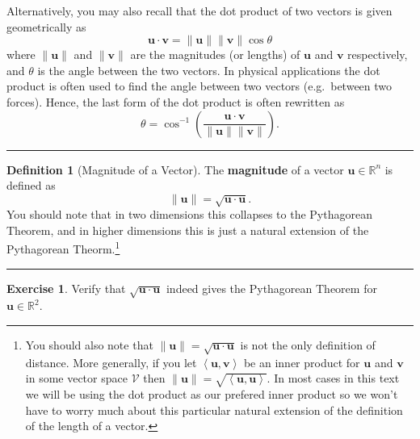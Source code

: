 \documentclass[
]{book}
\theoremstyle{definition}
\newtheorem{definition}{Definition}[chapter]
\theoremstyle{definition}
\theoremstyle{definition}
\newtheorem{exercise}{Exercise}[chapter]
\theoremstyle{remark}
\begin{document}
Alternatively, you may also recall that the dot product of two vectors is given geometrically as
\[ \boldsymbol{u} \cdot \boldsymbol{v} = \|\boldsymbol{u} \| \|\boldsymbol{v}\| \cos \theta \]
where \(\|\boldsymbol{u}\|\) and \(\|\boldsymbol{v}\|\) are the magnitudes (or lengths) of \(\boldsymbol{u}\) and \(\boldsymbol{v}\) respectively, and \(\theta\) is the angle between the two vectors. In physical applications the dot product is often used to find the angle between two vectors (e.g.~between two forces). Hence, the last form of the dot product is often rewritten as
\[ \theta = \cos^{-1}\left( \frac{\boldsymbol{u} \cdot \boldsymbol{v}}{ \|\boldsymbol{u} \| \| \boldsymbol{v} \|} \right). \]

\begin{center}\rule{0.5\linewidth}{0.5pt}\end{center}

\begin{definition}[Magnitude of a Vector]
\protect\hypertarget{def:unnamed-chunk-290}{}{\label{def:unnamed-chunk-290} {} }The \textbf{magnitude} of a vector \(\boldsymbol{u} \in \mathbb{R}^n\) is defined as
\[ \| \boldsymbol{u} \| = \sqrt{\boldsymbol{u} \cdot \boldsymbol{u}}. \]
You should note that in two dimensions this collapses to the Pythagorean Theorem, and in higher dimensions this is just a natural extension of the Pythagorean Theorm.\footnote{You should also note that \(\|\boldsymbol{u}\| = \sqrt{\boldsymbol{u} \cdot \boldsymbol{u}}\) is not the only definition of distance. More generally, if you let \(\left< \boldsymbol{u}, \boldsymbol{v}\right>\) be an inner product for \(\boldsymbol{u}\) and \(\boldsymbol{v}\) in some vector space \(\mathcal{V}\) then \(\|\boldsymbol{u}\| = \sqrt{\left< \boldsymbol{u}, \boldsymbol{u}\right>}\). In most cases in this text we will be using the dot product as our prefered inner product so we won't have to worry much about this particular natural extension of the definition of the length of a vector.}
\end{definition}

\begin{center}\rule{0.5\linewidth}{0.5pt}\end{center}

\begin{exercise}
\protect\hypertarget{exr:unnamed-chunk-291}{}{\label{exr:unnamed-chunk-291} }Verify that \(\sqrt{\boldsymbol{u} \cdot \boldsymbol{u}}\) indeed gives the Pythagorean Theorem for \(\boldsymbol{u} \in \mathbb{R}^2\).
\end{exercise}
\end{document}
